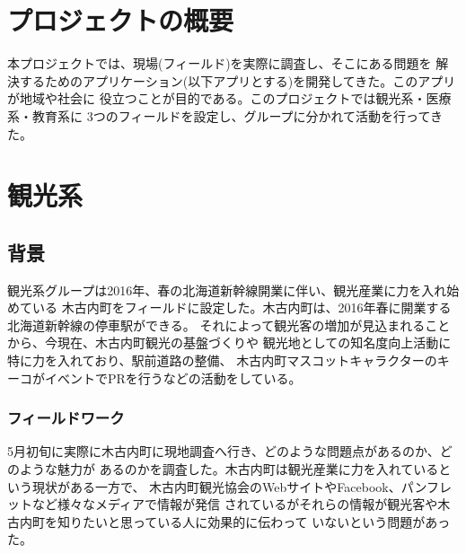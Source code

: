 \documentclass[twocolumn,draft]{jsarticle}
\begin{document}
\fontsize{10}{18}\selectfont

%


\section{プロジェクトの概要}
\begin{hissu}

本プロジェクトでは、現場(フィールド)を実際に調査し、そこにある問題を
解決するためのアプリケーション(以下アプリとする)を開発してきた。このアプリが地域や社会に
役立つことが目的である。このプロジェクトでは観光系・医療系・教育系に
3つのフィールドを設定し、グループに分かれて活動を行ってきた。

\end{hissu}

\section{観光系}
\subsection{背景}
\begin{hissu}
観光系グループは2016年、春の北海道新幹線開業に伴い、観光産業に力を入れ始めている
木古内町をフィールドに設定した。木古内町は、2016年春に開業する北海道新幹線の停車駅ができる。
それによって観光客の増加が見込まれることから、今現在、木古内町観光の基盤づくりや
観光地としての知名度向上活動に特に力を入れており、駅前道路の整備、
木古内町マスコットキャラクターのキーコがイべントでPRを行うなどの活動をしている。
\end{hissu}
\subsubsection{フィールドワーク}
\begin{hissu}
5月初旬に実際に木古内町に現地調査へ行き、どのような問題点があるのか、どのような魅力が
あるのかを調査した。木古内町は観光産業に力を入れているという現状がある一方で、
木古内町観光協会のWebサイトやFacebook、パンフレットなど様々なメディアで情報が発信
されているがそれらの情報が観光客や木古内町を知りたいと思っている人に効果的に伝わって
いないという問題があった。
\end{hissu}
\end{document}
